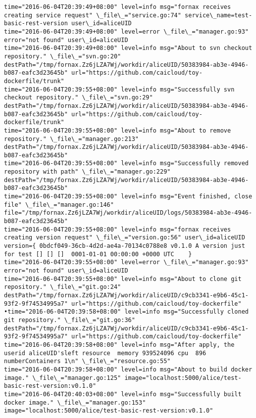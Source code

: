 \begin{lstlisting}[caption={Fornax功能性测试日志}]
time="2016-06-04T20:39:49+08:00" level=info msg="fornax receives creating service request" \_file\_="service.go:74" service\_name=test-basic-rest-version user\_id=aliceUID 
time="2016-06-04T20:39:49+08:00" level=error \_file\_="manager.go:93" error="not found" user\_id=aliceUID 
time="2016-06-04T20:39:49+08:00" level=info msg="About to svn checkout repository." \_file\_="svn.go:20" destPath="/tmp/fornax.Zz6jLZA7Wj/workdir/aliceUID/50383984-ab3e-4946-b087-eafc3d23645b" url="https://github.com/caicloud/toy-dockerfile/trunk" 
time="2016-06-04T20:39:55+08:00" level=info msg="Successfully svn checkout repository." \_file\_="svn.go:29" destPath="/tmp/fornax.Zz6jLZA7Wj/workdir/aliceUID/50383984-ab3e-4946-b087-eafc3d23645b" url="https://github.com/caicloud/toy-dockerfile/trunk" 
time="2016-06-04T20:39:55+08:00" level=info msg="About to remove repository." \_file\_="manager.go:213" destPath="/tmp/fornax.Zz6jLZA7Wj/workdir/aliceUID/50383984-ab3e-4946-b087-eafc3d23645b" 
time="2016-06-04T20:39:55+08:00" level=info msg="Successfully removed repository with path" \_file\_="manager.go:229" destPath="/tmp/fornax.Zz6jLZA7Wj/workdir/aliceUID/50383984-ab3e-4946-b087-eafc3d23645b" 
time="2016-06-04T20:39:55+08:00" level=info msg="Event finished, close file" \_file\_="manager.go:146" file="/tmp/fornax.Zz6jLZA7Wj/workdir/aliceUID/logs/50383984-ab3e-4946-b087-eafc3d23645b" 
time="2016-06-04T20:39:55+08:00" level=info msg="fornax receives creating version request" \_file\_="version.go:56" user\_id=aliceUID version={ 0bdcf049-36cb-4d2d-ae4a-70134c0788e8 v0.1.0 A version just for test [] [] []  0001-01-01 00:00:00 +0000 UTC    } 
time="2016-06-04T20:39:55+08:00" level=error \_file\_="manager.go:93" error="not found" user\_id=aliceUID 
time="2016-06-04T20:39:55+08:00" level=info msg="About to clone git repository." \_file\_="git.go:24" destPath="/tmp/fornax.Zz6jLZA7Wj/workdir/aliceUID/c9cb3341-e9b6-45c1-93f2-9f74534995a7" url="https://github.com/caicloud/toy-dockerfile" 
•time="2016-06-04T20:39:58+08:00" level=info msg="Successfully cloned git repository." \_file\_="git.go:36" destPath="/tmp/fornax.Zz6jLZA7Wj/workdir/aliceUID/c9cb3341-e9b6-45c1-93f2-9f74534995a7" url="https://github.com/caicloud/toy-dockerfile" 
time="2016-06-04T20:39:58+08:00" level=info msg="After apply, the userid aliceUID'sleft resource  memory 939524096 cpu  896 numberContainers 1\n" \_file\_="resource.go:55" 
time="2016-06-04T20:39:58+08:00" level=info msg="About to build docker image." \_file\_="manager.go:125" image="localhost:5000/alice/test-basic-rest-version:v0.1.0" 
time="2016-06-04T20:40:03+08:00" level=info msg="Successfully built docker image." \_file\_="manager.go:153" image="localhost:5000/alice/test-basic-rest-version:v0.1.0" 

\end{lstlisting}
